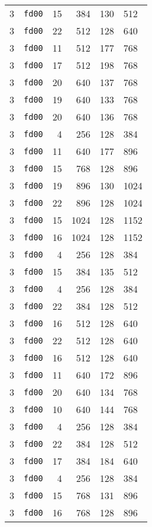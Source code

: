 \documentclass{article}
\begin{document}
\begin{table}[h!]
\begin{tabular}{llrrrl}
    3 & \texttt{fd00} & 15 & 384 & 130 & 512 \\
    3 & \texttt{fd00} & 22 & 512 & 128 & 640 \\
    3 & \texttt{fd00} & 11 & 512 & 177 & 768 \\
    3 & \texttt{fd00} & 17 & 512 & 198 & 768 \\
    3 & \texttt{fd00} & 20 & 640 & 137 & 768 \\
    3 & \texttt{fd00} & 19 & 640 & 133 & 768 \\
    3 & \texttt{fd00} & 20 & 640 & 136 & 768 \\
    3 & \texttt{fd00} & 4 & 256 & 128 & 384 \\
    3 & \texttt{fd00} & 11 & 640 & 177 & 896 \\
    3 & \texttt{fd00} & 15 & 768 & 128 & 896 \\
    3 & \texttt{fd00} & 19 & 896 & 130 & 1024 \\
    3 & \texttt{fd00} & 22 & 896 & 128 & 1024 \\
    3 & \texttt{fd00} & 15 & 1024 & 128 & 1152 \\
    3 & \texttt{fd00} & 16 & 1024 & 128 & 1152 \\
    3 & \texttt{fd00} & 4 & 256 & 128 & 384 \\
    3 & \texttt{fd00} & 15 & 384 & 135 & 512 \\
    3 & \texttt{fd00} & 4 & 256 & 128 & 384 \\
    3 & \texttt{fd00} & 22 & 384 & 128 & 512 \\
    3 & \texttt{fd00} & 16 & 512 & 128 & 640 \\
    3 & \texttt{fd00} & 22 & 512 & 128 & 640 \\
    3 & \texttt{fd00} & 16 & 512 & 128 & 640 \\
    3 & \texttt{fd00} & 11 & 640 & 172 & 896 \\
    3 & \texttt{fd00} & 20 & 640 & 134 & 768 \\
    3 & \texttt{fd00} & 10 & 640 & 144 & 768 \\
    3 & \texttt{fd00} & 4 & 256 & 128 & 384 \\
    3 & \texttt{fd00} & 22 & 384 & 128 & 512 \\
    3 & \texttt{fd00} & 17 & 384 & 184 & 640 \\
    3 & \texttt{fd00} & 4 & 256 & 128 & 384 \\
    3 & \texttt{fd00} & 15 & 768 & 131 & 896 \\
    3 & \texttt{fd00} & 16 & 768 & 128 & 896 \\

\end{tabular}
\end{table}
\end{document}
